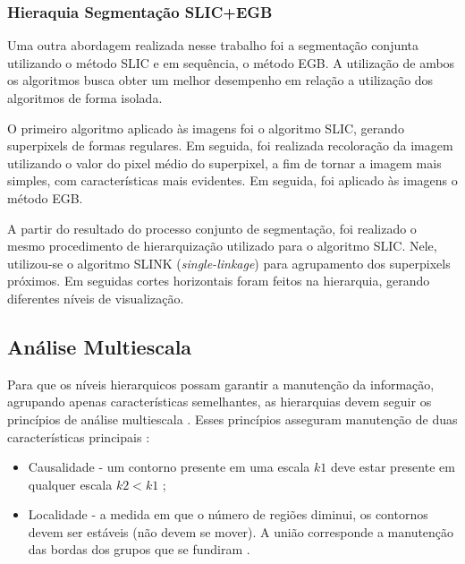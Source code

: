\begin{document}

\subsubsection{Hieraquia Segmentação SLIC+EGB} \label{sssec:hierq_segm_segb}

Uma outra abordagem realizada nesse trabalho foi a segmentação conjunta utilizando o método SLIC e em sequência, o método EGB. A utilização de ambos os algoritmos busca obter um melhor desempenho em relação a utilização  dos algoritmos de forma isolada. 

O primeiro algoritmo aplicado às imagens foi o algoritmo SLIC, gerando superpixels de formas regulares. Em seguida, foi realizada recoloração da imagem utilizando o valor do pixel médio do superpixel, a fim de tornar a imagem mais simples, com características mais evidentes. Em seguida, foi aplicado às imagens o método EGB.

A partir do resultado do processo conjunto de segmentação, foi realizado o mesmo procedimento de hierarquização utilizado para o algoritmo SLIC. Nele, utilizou-se o algoritmo SLINK (\textit{single-linkage}) para agrupamento dos superpixels próximos. Em seguidas cortes horizontais foram feitos na hierarquia, gerando diferentes níveis de visualização.


\subsection{Análise Multiescala} \label{ssec:analise_multiescala}

Para que os níveis hierarquicos possam garantir a manutenção da informação, agrupando apenas características semelhantes, as hierarquias devem seguir os princípios de análise multiescala \cite{SILVIO_ZENILTON}. Esses princípios asseguram manutenção de duas características principais \cite{SILVIO_ZENILTON}:

\begin{itemize}
 \item Causalidade - um contorno presente em uma escala $k1$ deve estar presente em qualquer escala $k2 < k1$ \cite{SILVIO_ZENILTON};
 \item Localidade - a medida em que o número de regiões diminui, os contornos devem ser estáveis (não devem se mover). A união corresponde a manutenção das bordas dos grupos que se fundiram \cite{SILVIO_ZENILTON}.
\end{itemize}
\end{document}
